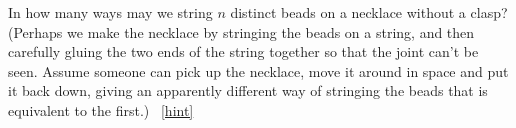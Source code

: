 \documentclass{book}
\begin{document}
\setcounter{project}{111}
\addtocounter{project}{-1}
\begin{activity}[]\label{necklace}
\hypertarget{p-806}{}%
In how many ways may we string \(n\) distinct beads on a necklace without a clasp? (Perhaps we make the necklace by stringing the beads on a string, and then carefully gluing the two ends of the string together so that the joint can't be seen. Assume someone can pick up the necklace, move it around in space and put it back down, giving an apparently different way of stringing the beads that is equivalent to the first.)%
~\hfill{\tiny\hyperlink{a-111}{[hint]}\hypertarget{q-111}{}}\end{activity}
\end{document}
